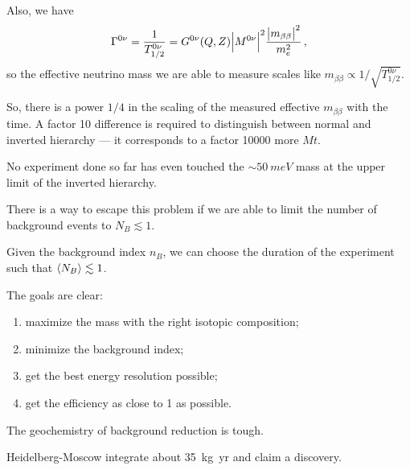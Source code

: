 \documentclass[main.tex]{subfiles}
\begin{document}
Also, we have 
%
\begin{align}
\Gamma^{0 \nu } = \frac{1}{T^{0 \nu }_{1/2}} = G^{0 \nu } (Q, Z) \abs{M^{0 \nu }}^2 \frac{\abs{m_{\beta \beta }}^2}{m_e^2}
\,,
\end{align}
%
so the effective neutrino mass we are able to measure scales like \(m_{\beta \beta } \propto 1/ \sqrt{T_{1/2}^{0 \nu }}\). 

So, there is a power \(1/4\) in the scaling of the measured effective \(m_{\beta \beta }\) with the time. 
A factor 10 difference is required to distinguish between normal and inverted hierarchy --- it corresponds to a factor 10000 more \(M t\). 

No experiment done so far has even touched the \(\sim \SI{50}{meV}\) mass at the upper limit of the inverted hierarchy. 

There is a way to escape this problem if we are able to limit the number of background events to \(N_B \lesssim 1\). 

Given the background index \(n_B\), we can choose the duration of the experiment such that \(\expval{N_B} \lesssim 1\). 


The goals are clear: 
\begin{enumerate}
    \item maximize the mass with the right isotopic composition;
    \item minimize the background index;
    \item get the best energy resolution possible;
    \item get the efficiency as close to 1 as possible.
\end{enumerate}

The geochemistry of background reduction is tough. 

Heidelberg-Moscow integrate about \SI{35}{kg yr} and claim a discovery. 
\end{document}
